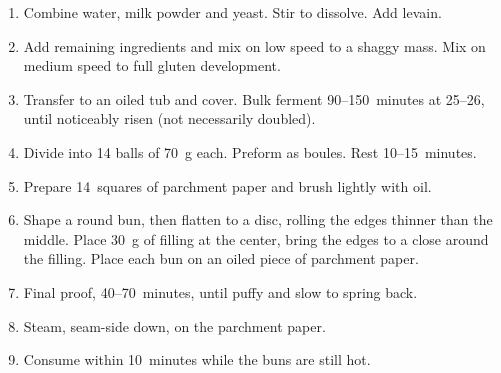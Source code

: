 
\begin{ingredients}
\end{ingredients}


\begin{recipe}
  \begin{enumerate}

  \item Combine water, milk powder and yeast.  Stir to dissolve.  Add
    levain.

  \item Add remaining ingredients and mix on low speed to a shaggy
    mass.  Mix on medium speed to full gluten development.

  \item Transfer to an oiled tub and cover.  Bulk ferment
    90--150~minutes at 25--26\degreeC, until noticeably risen (not
    necessarily doubled).

  \item Divide into 14 balls of 70~g each.  Preform as boules.  Rest
    10--15~minutes.

  \item Prepare 14~squares of parchment paper and brush lightly with
    oil.

  \item Shape a round bun, then flatten to a disc, rolling the edges
    thinner than the middle.  Place 30~g of filling at the center,
    bring the edges to a close around the filling.  Place each bun on
    an oiled piece of parchment paper.

  \item Final proof, 40--70~minutes, until puffy and slow to spring
    back.

  \item Steam, seam-side down, on the parchment paper.

  \item Consume within 10~minutes while the buns are still hot.

  \end{enumerate}
\end{recipe}

